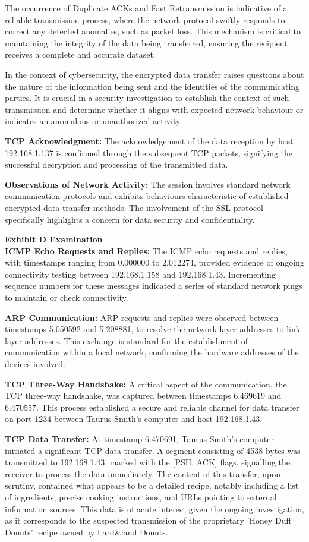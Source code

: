 The occurrence of Duplicate ACKs and Fast Retransmission is indicative of a reliable transmission process, where the network protocol swiftly responds to correct any detected anomalies, such as packet loss. This mechanism is critical to maintaining the integrity of the data being transferred, ensuring the recipient receives a complete and accurate dataset.

In the context of cybersecurity, the encrypted data transfer raises questions about the nature of the information being sent and the identities of the communicating parties. It is crucial in a security investigation to establish the context of such transmission and determine whether it aligns with expected network behaviour or indicates an anomalous or unauthorized activity.

\textbf{TCP Acknowledgment:} The acknowledgement of the data reception by host 192.168.1.137 is confirmed through the subsequent TCP packets, signifying the successful decryption and processing of the transmitted data.

\textbf{Observations of Network Activity:} The session involves standard network communication protocols and exhibits behaviours characteristic of established encrypted data transfer methods. The involvement of the SSL protocol specifically highlights a concern for data security and confidentiality.

\textbf{Exhibit D Examination}\\
\textbf{ICMP Echo Requests and Replies:} The ICMP echo requests and replies, with timestamps ranging from 0.000000 to 2.012274, provided evidence of ongoing connectivity testing between 192.168.1.158 and 192.168.1.43. Incrementing sequence numbers for these messages indicated a series of standard network pings to maintain or check connectivity.

\textbf{ARP Communication:} ARP requests and replies were observed between timestamps 5.050592 and 5.208881, to resolve the network layer addresses to link layer addresses. This exchange is standard for the establishment of communication within a local network, confirming the hardware addresses of the devices involved.

\textbf{TCP Three-Way Handshake:} A critical aspect of the communication, the TCP three-way handshake, was captured between timestamps 6.469619 and 6.470557. This process established a secure and reliable channel for data transfer on port 1234 between Taurus Smith's computer and host 192.168.1.43.

\textbf{TCP Data Transfer:} At timestamp 6.470691, Taurus Smith's computer initiated a significant TCP data transfer. A segment consisting of 4538 bytes was transmitted to 192.168.1.43, marked with the [PSH, ACK] flags, signalling the receiver to process the data immediately. The content of this transfer, upon scrutiny, contained what appears to be a detailed recipe, notably including a list of ingredients, precise cooking instructions, and URLs pointing to external information sources. This data is of acute interest given the ongoing investigation, as it corresponds to the suspected transmission of the proprietary 'Honey Duff Donuts' recipe owned by Lard\&land Donuts.

